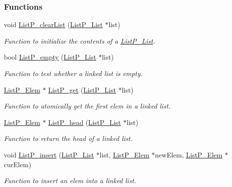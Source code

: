 \subsubsection*{Functions}
\begin{DoxyCompactItemize}
\item 
void \hyperlink{_list_p_8h_acf7a7d0665fa487873202cde1f2dbcfc}{List\+P\+\_\+clear\+List} (\hyperlink{struct_list_p___list}{List\+P\+\_\+\+List} $\ast$list)
\begin{DoxyCompactList}\small\item\em Function to initialize the contents of a \hyperlink{struct_list_p___list}{List\+P\+\_\+\+List}. \end{DoxyCompactList}\item 
bool \hyperlink{_list_p_8h_aebb024ac9981fa4b949da2cef1864706}{List\+P\+\_\+empty} (\hyperlink{struct_list_p___list}{List\+P\+\_\+\+List} $\ast$list)
\begin{DoxyCompactList}\small\item\em Function to test whether a linked list is empty. \end{DoxyCompactList}\item 
\hyperlink{struct_list_p___elem}{List\+P\+\_\+\+Elem} $\ast$ \hyperlink{_list_p_8h_a10d70aec4447b99682fda9a9a04bac41}{List\+P\+\_\+get} (\hyperlink{struct_list_p___list}{List\+P\+\_\+\+List} $\ast$list)
\begin{DoxyCompactList}\small\item\em Function to atomically get the first elem in a linked list. \end{DoxyCompactList}\item 
\hyperlink{struct_list_p___elem}{List\+P\+\_\+\+Elem} $\ast$ \hyperlink{_list_p_8h_a906d92563e669e8bc403c3ade2c3f315}{List\+P\+\_\+head} (\hyperlink{struct_list_p___list}{List\+P\+\_\+\+List} $\ast$list)
\begin{DoxyCompactList}\small\item\em Function to return the head of a linked list. \end{DoxyCompactList}\item 
void \hyperlink{_list_p_8h_a6c01e0009d184925094cdc25bb2d4beb}{List\+P\+\_\+insert} (\hyperlink{struct_list_p___list}{List\+P\+\_\+\+List} $\ast$list, \hyperlink{struct_list_p___elem}{List\+P\+\_\+\+Elem} $\ast$new\+Elem, \hyperlink{struct_list_p___elem}{List\+P\+\_\+\+Elem} $\ast$cur\+Elem)
\begin{DoxyCompactList}\small\item\em Function to insert an elem into a linked list. \end{DoxyCompactList}\item 

\end{DoxyCompactItemize}
